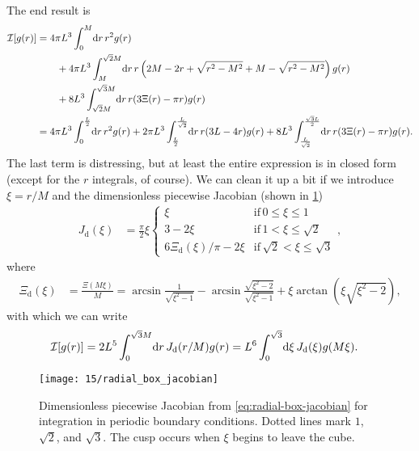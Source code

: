 The end result is
\begin{subequations}
\begin{align}
	\mathcal{I}[g(r)]
	&= 4 \pi L^3 \int_0^M\! \dif r \, r^2 g(r) \notag \\
	&\qquad
		+ 4 \pi L^3 \int_M^{\sqrt{2} M}\! \dif r \, r \left( 2 M - 2 r + \sqrt{r^2 - M^2} + M - \sqrt{r^2 - M^2} \right) g(r) \notag \\
	&\qquad
		+ 8 L^3 \int_{\sqrt{2} M}^{\sqrt{3} M}\! \dif r \, r (3 \Xi(r) - \pi r) g(r) \\
	&= 4 \pi L^3 \int_0^{\frac{L}{2}}\! \dif r \, r^2 g(r)
		+ 2 \pi L^3 \int_{\frac{L}{2}}^{\frac{L}{\sqrt{2}}}\! \dif r \, r (3 L - 4 r) g(r)
		+ 8 L^3 \int_{\frac{L}{\sqrt{2}}}^{\frac{\sqrt{3} L}{2}}\! \dif r \, r (3 \Xi(r) - \pi r) g(r).
\end{align}
\end{subequations}
The last term is distressing, but at least the entire expression is in closed form (except for the $r$ integrals, of course).
We can clean it up a bit if we introduce $\xi = r / M$ and the dimensionless piecewise Jacobian (shown in \cref{fig:radial-box-jacobian})
\begin{align}
	J_\mathrm{d}(\xi)
	&= \frac{\pi}{2} \xi \begin{cases}
			\xi & \mathrm{if}\, 0 \le \xi \le 1 \\
			3 - 2 \xi & \mathrm{if}\, 1 < \xi \le \sqrt{2} \\
			6 \Xi_\mathrm{d}(\xi) / \pi - 2 \xi & \mathrm{if}\, \sqrt{2} < \xi \le \sqrt{3}
		\end{cases},
			\label{eq:radial-box-jacobian}
\end{align}
where
\begin{align}
	\Xi_\mathrm{d}(\xi)
	&= \frac{\Xi(M \xi)}{M}
	= \arcsin{\frac{1}{\sqrt{\xi^2 - 1}}}
		- \arcsin{\frac{\sqrt{\xi^2 - 2}}{\sqrt{\xi^2 - 1}}}
		+ \xi \arctan{(\xi \sqrt{\xi^2 - 2})},
			\label{eq:radial-box-jacobian-tail}
\end{align}
with which we can write
\begin{align}
	\mathcal{I}[g(r)]
	&= 2 L^5 \int_0^{\sqrt{3} M}\! \dif r \, J_\mathrm{d}(r / M) g(r)
	= L^6 \int_0^{\sqrt{3}}\! \dif \xi \, J_\mathrm{d}(\xi) g(M \xi).
\end{align}

\begin{figure}
	\centering
	\texttt{[image: 15/radial\_box\_jacobian]}
	\caption[
		Dimensionless piecewise Jacobian for integration in periodic boundary conditions
	]{
		Dimensionless piecewise Jacobian from \cref{eq:radial-box-jacobian} for integration in periodic boundary conditions.
		Dotted lines mark $1$, $\sqrt{2}$, and $\sqrt{3}$.
		The cusp occurs when $\xi$ begins to leave the cube.
	}
	\label{fig:radial-box-jacobian}
\end{figure}

